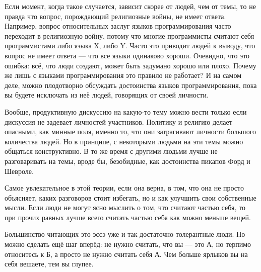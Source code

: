 \documentclass[ebook,12pt,oneside,openany]{memoir}
\begin{document}
Если момент, когда такое случается, зависит скорее от людей, чем от
темы, то не правда что вопрос, порождающий религиозные войны, не имеет
ответа. Например, вопрос относительных заслуг языков программирования
часто переходит в религиозную войну, потому что многие программисты
считают себя программистами либо языка Х, либо Y. Часто это приводит
людей к выводу, что вопрос не имеет ответа — что все языки одинаково
хороши. Очевидно, что это ошибка: всё, что люди создают, может быть
задумано хорошо или плохо. Почему же лишь с языками программирования
это правило не работает? И на самом деле, можно плодотворно обсуждать
достоинства языков программирования, пока вы будете исключать из неё
людей, говорящих от своей личности.

Вообще, продуктивную дискуссию на какую-то тему можно вести только
если дискуссия не задевает личностей участников. Политику и религию
делает опасными, как минные поля, именно то, что они затрагивают
личности большого количества людей. Но в принципе, с некоторыми людьми
на эти темы можно общаться конструктивно. В то же время с другими
людьми лучше не разговаривать на темы, вроде бы, безобидные, как
достоинства пикапов Форд и Шевроле.

Самое увлекательное в этой теории, если она верна, в том, что она не
просто объясняет, каких разговоров стоит избегать, но и как улучшить
свои собственные мысли. Если люди не могут ясно мыслить о том, что
считают частью себя, то при прочих равных лучше всего считать частью
себя как можно меньше вещей.

Большинство читающих это эссэ уже и так достаточно толерантные люди.
Но можно сделать ещё шаг вперёд: не нужно считать, что вы — это А, но
терпимо относитесь к Б, а просто не нужно считать себя А. Чем больше
ярлыков вы на себя вешаете, тем вы глупее.
\end{document}
